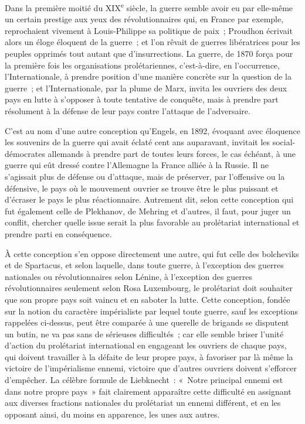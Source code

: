 \documentclass[french,twoside]{book} %
\begin{document}
Dans la première moitié du XIX\textsuperscript{e} siècle, la guerre semble avoir eu par elle-même un certain prestige aux yeux des révolutionnaires qui, en France par exemple, reprochaient vivement à Louis-Philippe sa politique de paix ; Proud­hon écrivait alors un éloge éloquent de la guerre ; et l'on rêvait de guerres libératrices pour les peuples opprimés tout autant que d'insurrections. La guerre, de 1870 força pour la première fois les organisations proléta­riennes, c'est-à-dire, en l'occurrence, l'Internationale, à prendre position d'une manière concrète sur la question de la guerre ; et l'Internationale, par la plume de Marx, invita les ouvriers des deux pays en lutte à s'opposer à toute tentative de conquête, mais à prendre part résolument à la défense de leur pays contre l'attaque de l'adversaire.\par
C'est au nom d'une autre conception qu'Engels, en 1892, évoquant avec éloquence les souvenirs de la guerre qui avait éclaté cent ans auparavant, invitait les social-démocrates allemands à prendre part de toutes leurs forces, le cas échéant, à une guerre qui eût dressé contre l'Allemagne la France alliée à la Russie. Il ne s'agissait plus de défense ou d'attaque, mais de préserver, par l'offensive ou la défensive, le pays où le mouvement ouvrier se trouve être le plus puissant et d'écraser le pays le plus réactionnaire. Autrement dit, selon cette conception qui fut également celle de Plekhanov, de Mehring et d'autres, il faut, pour juger un conflit, chercher quelle issue serait la plus favorable au prolétariat international et prendre parti en conséquence.\par
À cette conception s'en oppose directement une autre, qui fut celle des bolcheviks et de Spartacus, et selon laquelle, dans toute guerre, à l'exception des guerres nationales ou révolutionnaires selon Lénine, à l'exception des guerres révolutionnaires seulement selon Rosa Luxembourg, le prolétariat doit souhaiter que son propre pays soit vaincu et en saboter la lutte. Cette concep­tion, fondée sur la notion du caractère impérialiste par lequel toute guerre, sauf les exceptions rappelées ci-dessus, peut être comparée à une querelle de brigands se disputent un butin, ne va pas sans de sérieuses difficultés ; car elle semble briser l'unité d'action du prolétariat international en engageant les ouvriers de chaque pays, qui doivent travailler à la défaite de leur propre pays, à favoriser par là même la victoire de l'impérialisme ennemi, victoire que d'autres ouvriers doivent s'efforcer d'empêcher. La célèbre formule de Liebknecht : « Notre principal ennemi est dans notre propre pays » fait claire­ment apparaître cette difficulté en assignant aux diverses fractions nationales du prolétariat un ennemi différent, et en les opposant ainsi, du moins en apparence, les unes aux autres.\par
\end{document}
